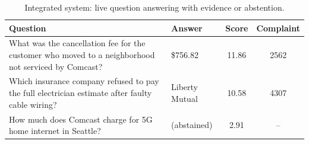 \begin{table}[H]
\centering
\footnotesize
\caption{Integrated system: live question answering with evidence or abstention.}
\label{tab:demoqa}
\begin{tabular}{p{8.0cm}p{2.6cm}cc}
\toprule
Question & Answer & Score & Complaint \\
\midrule
What was the cancellation fee for the customer who moved to a neighborhood not serviced by Comcast? & \$756.82 & 11.86 & 2562 \\
Which insurance company refused to pay the full electrician estimate after faulty cable wiring? & Liberty Mutual & 10.58 & 4307 \\
How much does Comcast charge for 5G home internet in Seattle? & (abstained) & 2.91 & -- \\
\bottomrule
\end{tabular}
\end{table}